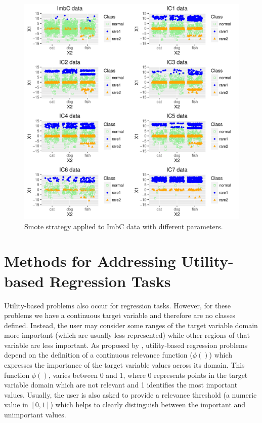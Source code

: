 \documentclass[10pt,a4paper]{article}\usepackage[]{graphicx}\usepackage[]{color}
\makeatletter
\def\maxwidth{ %
  \ifdim\Gin@nat@width>\linewidth
    \linewidth
  \else
    \Gin@nat@width
  \fi
}
\newenvironment{knitrout}{}{} %
\makeatother
\begin{document}
\begin{knitrout}\footnotesize
{}\color{fgcolor}\begin{figure}

{\centering \includegraphics[width=\maxwidth]{figures/UBL-smote_plot-1} 

}

\caption[Smote strategy applied to ImbC data with different parameters]{Smote strategy applied to ImbC data with different parameters.}\label{fig:smote_plot}
\end{figure}


\end{knitrout}


\section{Methods for Addressing Utility-based Regression Tasks}\label{sec:methRegres}

Utility-based problems also occur for regression tasks. However, for these problems we have a continuous target variable and therefore are no classes defined. Instead, the user may consider some ranges of the target variable domain more important (which are usually less represented) while other regions of that variable are less important. As proposed by \cite{torgo2007utility, ribeiro2011utility}, utility-based regression problems depend on the definition of a continuous relevance function ($\phi()$) which expresses the importance of the target variable values across its domain. This function $\phi()$, varies between 0 and 1, where 0 represents points in the target variable domain which are not relevant and 1 identifies the most important values. Usually, the user is also asked to provide a relevance threshold (a numeric value in $[0,1]$) which helps to clearly distinguish between the important and unimportant values.
\end{document}
